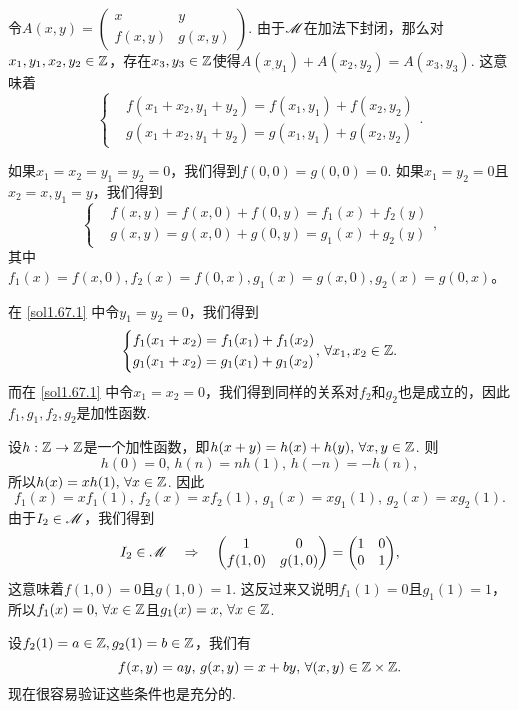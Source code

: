 \begin{solution}
  令$A(x,y)=\begin{pmatrix}
    x & y \\
    f(x,y) & g(x,y)
  \end{pmatrix}$. 由于$\mathscr M$在加法下封闭，那么对$x_1,y_1,x_2,y_2\in\mathbb Z$，存在$x_3,y_3\in\mathbb Z$使得$A(x_,y_1)+A(x_2,y_2)=A(x_3,y_3)$. 这意味着
  \begin{equation}\label{sol1.67.1}
    \left\{
      \begin{aligned}
        & f(x_1 + x_2, y_1 + y_2) = f(x_1,y_1) + f(x_2,y_2) \\
        & g(x_1 + x_2, y_1 + y_2) = g(x_1,y_1) + g(x_2,y_2)
      \end{aligned}
    \right..
  \end{equation}

  如果$x_1=x_2=y_1=y_2=0$，我们得到$f(0,0)=g(0,0)=0$. 如果$x_1=y_2=0$且$x_2=x,y_1=y$，我们得到
  \[
    \left\{
      \begin{aligned}
        & f(x,y) = f(x,0) + f(0,y) = f_1(x) + f_2(y) \\
        & g(x,y) = g(x,0) + g(0,y) =g_1(x) + g_2(y)
      \end{aligned}
    \right.,
  \]
  其中$f_1(x)=f(x,0),f_2(x)=f(0,x),
  g_1(x)=g(x,0),g_2(x)=g(0,x)$。

  在 \eqref{sol1.67.1} 中令$y_1=y_2=0$，我们得到
  \[
    \left\{
      \begin{aligned}
        & f_1(x_1 + x_2) = f_1(x_1) + f_1(x_2) \\
        & g_1(x_1 + x_2) = g_1(x_1) + g_1(x_2)
      \end{aligned}
    \right.,\,\forall x_1,x_2\in\MZ.
  \]
  而在 \eqref{sol1.67.1} 中令$x_1=x_2=0$，我们得到同样的关系对$f_2$和$g_2$也是成立的，因此$f_1,g_1,f_2,g_2$是加性函数.

  设$h:\mathbb Z\to\mathbb Z$是一个加性函数，即$h(x+y)=h(x)+h(y),\,\forall x,y\in\mathbb Z$. 则
  \[
    h(0)=0,\,h(n) = nh(1),\, h(-n) = - h(n),
  \]
  所以$h(x)=xh(1),\,\forall x\in\mathbb Z$. 因此
  \[
    f_1(x) = xf_1(1),\, f_2(x) = xf_2(1),\,
    g_1(x) = xg_1(1),\, g_2(x) = xg_2(1).
  \]
  由于$I_2\in\mathscr M$，我们得到
  \[
    I_2 \in \MM \quad \Rightarrow \quad
    \begin{pmatrix}
      1 & 0 \\
      f(1,0) & g(1,0)
    \end{pmatrix} = \begin{pmatrix}
      1 & 0 \\
      0 & 1
    \end{pmatrix},
  \]
  这意味着$f(1,0)=0$且$g(1,0)=1$. 这反过来又说明$f_1(1)=0$且$g_1(1)=1$，所以$f_1(x)=0,\,\forall x\in\mathbb Z$且$g_1(x)=x,\,\forall x\in\mathbb Z$.

  设$f_2(1)=a\in\mathbb Z,g_2(1)=b\in\mathbb Z$，我们有
  \[
    f(x,y) = ay,\,g(x,y) = x + by,\,\forall (x,y)\in\mathbb Z \times \mathbb Z.
  \]
  现在很容易验证这些条件也是充分的.
\end{solution}

